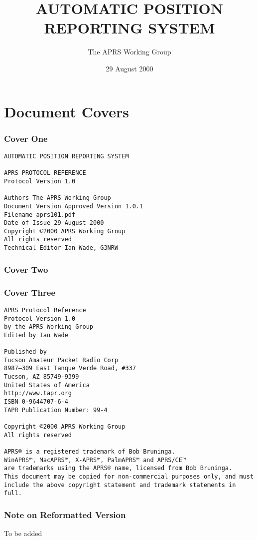 \documentclass{scrreprt}[letter]
\title{AUTOMATIC POSITION REPORTING SYSTEM}
\date{29 August 2000}
\author{The APRS Working Group}
\begin{document}
\maketitle

\part{Document Covers}
\section{Cover One}

\begin{verbatim}
AUTOMATIC POSITION REPORTING SYSTEM

APRS PROTOCOL REFERENCE
Protocol Version 1.0

Authors The APRS Working Group
Document Version Approved Version 1.0.1
Filename aprs101.pdf
Date of Issue 29 August 2000
Copyright ©2000 APRS Working Group
All rights reserved
Technical Editor Ian Wade, G3NRW
\end{verbatim}


\section{Cover Two}



\section{Cover Three}

\begin{verbatim}
APRS Protocol Reference
Protocol Version 1.0
by the APRS Working Group
Edited by Ian Wade

Published by
Tucson Amateur Packet Radio Corp
8987–309 East Tanque Verde Road, #337
Tucson, AZ 85749-9399
United States of America
http://www.tapr.org
ISBN 0-9644707-6-4
TAPR Publication Number: 99-4

Copyright ©2000 APRS Working Group
All rights reserved

APRS® is a registered trademark of Bob Bruninga.
WinAPRS™, MacAPRS™, X-APRS™, PalmAPRS™ and APRS/CE™
are trademarks using the APRS® name, licensed from Bob Bruninga.
This document may be copied for non-commercial purposes only, and must
include the above copyright statement and trademark statements in full.
\end{verbatim}

\section{Note on Reformatted Version}
To be added
\end{document}
